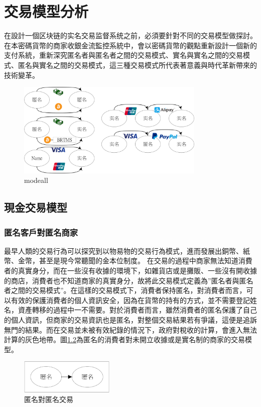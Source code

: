 
\chapter{交易模型分析}
在設計一個区块链的实名交易监督系统之前，必須要針對不同的交易模型做探討。
在本密碼貨幣的商家收銀金流監控系統中，會以密碼貨幣的觀點重新設計一個新的支付系統，重新深究匿名者與匿名者之間的交易模式、實名與實名之間的交易模式、匿名與實名之間的交易模式，這三種交易模式所代表著意義與時代革新帶來的技術變革。
\begin{figure}[h]
	\centering
	\includegraphics[width = 0.8\textwidth]{modeall.png}
	\caption{modeall}\label{modeall}
\end{figure}

	\section{現金交易模型}
		\subsection{匿名客戶對匿名商家}最早人類的交易行為可以探究到以物易物的交易行為模式，進而發展出銅幣、紙幣、金幣，甚至是現今常聽聞的金本位制度。 
		在交易的過程中商家無法知道消費者的真實身分，而在一些沒有收據的環境下，如雜貨店或是攤販、一些沒有開收據的商店，消費者也不知道商家的真實身分，故將此交易模式定義為”匿名者與匿名者之間的交易模式”。在這樣的交易模式下，消費者保持匿名，對消費者而言，可以有效的保護消費者的個人資訊安全，因為在貨幣的持有的方式，並不需要登記姓名，資產轉移的過程中一不需要。對於消費者而言，雖然消費者的匿名保護了自己的個人資訊，但商家的交易資訊也是匿名，對整個交易結果若有爭議，這便是追訴無門的結果。而在交易並未被有效紀錄的情況下，政府對稅收的計算，會進入無法計算的灰色地帶。圖\ref{modeaa}為匿名的消費者對未開立收據或是實名制的商家的交易模型。

		\begin{figure}[h]
			\centering
			\includegraphics[width = 0.4\textwidth]{modeaa.png}
			\caption{匿名對匿名交易}\label{modeaa}
		\end{figure}

